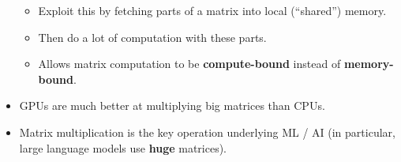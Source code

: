 \documentclass[a4paper,9pt]{extarticle}
\begin{document}
\begin{multicols}{2}
\begin{summary}
\begin{itemize}
\begin{itemize}
\item Exploit this by fetching parts of a matrix into local (``shared'') memory.

\item Then do a lot of computation with these parts.

\item Allows matrix computation to be \textbf{compute-bound} instead of
\textbf{memory-bound}.

\end{itemize}

\item GPUs are much better at multiplying big matrices than CPUs.

\item Matrix multiplication is the key operation underlying ML / AI (in particular, large
language models use \textbf{huge} matrices).

\end{itemize}

\end{summary}



\end{multicols}
\end{document}
